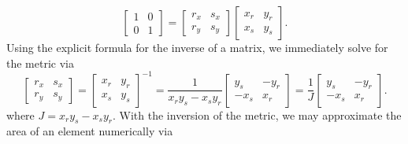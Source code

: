 \documentclass{article}
\begin{document}
  \begin{equation}
    \begin{bmatrix}
      1 & 0 \\
      0 & 1
    \end{bmatrix}
    = 
    \begin{bmatrix}
      r_x & s_x \\
      r_y & s_y
    \end{bmatrix}
    \begin{bmatrix}
      x_r & y_r \\
      x_s & y_s
    \end{bmatrix}.
  \end{equation}
Using the explicit formula for the inverse of a matrix, we immediately solve for the metric via
  \begin{equation}
    \begin{bmatrix}
      r_x & s_x \\
      r_y & s_y
    \end{bmatrix}
    =
    \begin{bmatrix}
      x_r & y_r \\
      x_s & y_s
    \end{bmatrix}^{-1}
    = \frac{1}{x_r y_s - x_s y_r}
    \begin{bmatrix}
      y_s & -y_r \\
      -x_s & x_r
    \end{bmatrix}
    = \frac{1}{J}
    \begin{bmatrix}
      y_s & -y_r \\
      -x_s & x_r
    \end{bmatrix}.
  \end{equation}
where $J = x_r y_s - x_s y_r$. With the inversion of the metric, we may approximate the area of an element numerically via
\end{document}
